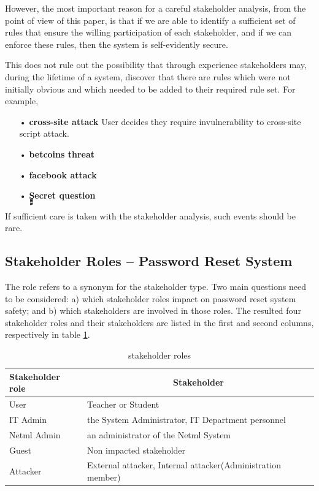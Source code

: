 However, the most important reason for a careful stakeholder analysis, from
the point of view of this paper, is that if we are able to identify a sufficient
set of rules that ensure the willing participation of each stakeholder, and 
if we can enforce these rules, then the system is self-evidently secure. 

This does not rule out the possibility that through experience stakeholders may, during the lifetime of a system, discover that there are rules which were not initially obvious and which needed to be added to their required rule set. 
\if
For example, 
\begin{itemize}
\item[•] \textbf{cross-site attack} User decides they require invulnerability to cross-site script attack.
\item[•] \textbf{betcoins threat} 
\item[•] \textbf{facebook attack} 
\item[•] \textbf{ٍٍٍSecret question} 

\end{itemize}

\fi
 If sufficient care is taken with the stakeholder analysis, such events should be rare.



\subsection{Stakeholder Roles -- Password Reset System}\label{Stakeholder Role}

The role refers to a synonym for the stakeholder type. Two main questions
need to be considered: a) which stakeholder roles impact on password
reset system safety; and b) which stakeholders are involved in those
roles. The  resulted four stakeholder roles and their stakeholders
are listed in the first and second columns, respectively in table
\ref{Stkroles}.

 \begin{table}[!htbp]	      %
	\begin{center}
\begin{tabular}{|l|p{5.5cm}|} \hline
 \textbf{Stakeholder role} & \multicolumn{1}{|c|}{\textbf{Stakeholder}} \\
\hline
 User & Teacher or Student \\
\hline
 IT Admin &  the System Administrator, IT Department personnel \\
\hline
 Netml Admin &  an administrator of the Netml System \\
\hline Guest & Non impacted stakeholder \\
\hline
 Attacker & External attacker, Internal attacker(Administration member) \\
\hline
	\end{tabular} \end{center} \caption{ stakeholder roles }
\label{Stkroles} \end{table}

